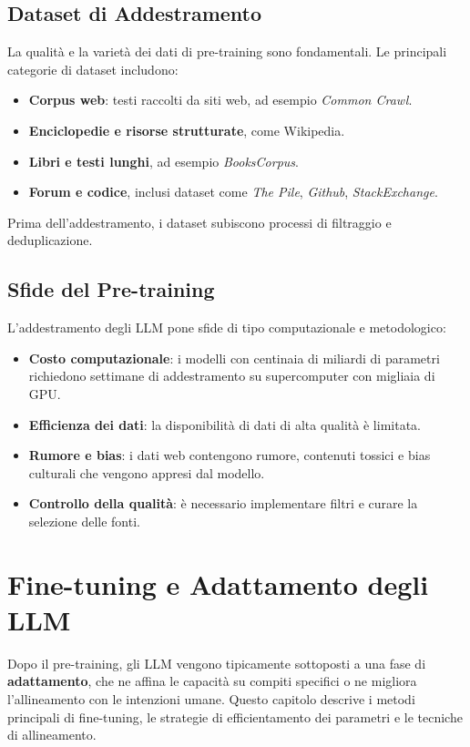 \subsection{Dataset di Addestramento}
La qualità e la varietà dei dati di pre-training sono fondamentali. Le principali categorie di dataset includono:
\begin{itemize}
    \item \textbf{Corpus web}: testi raccolti da siti web, ad esempio \textit{Common Crawl}.
    \item \textbf{Enciclopedie e risorse strutturate}, come Wikipedia.
    \item \textbf{Libri e testi lunghi}, ad esempio \textit{BooksCorpus}.
    \item \textbf{Forum e codice}, inclusi dataset come \textit{The Pile}, \textit{Github}, \textit{StackExchange}.
\end{itemize}
Prima dell'addestramento, i dataset subiscono processi di filtraggio e deduplicazione.

\subsection{Sfide del Pre-training}
L'addestramento degli LLM pone sfide di tipo computazionale e metodologico:
\begin{itemize}
    \item \textbf{Costo computazionale}: i modelli con centinaia di miliardi di parametri richiedono settimane di addestramento su supercomputer 
    con migliaia di GPU.
    \item \textbf{Efficienza dei dati}: la disponibilità di dati di alta qualità è limitata.
    \item \textbf{Rumore e bias}: i dati web contengono rumore, contenuti tossici e bias culturali che vengono appresi dal modello.
    \item \textbf{Controllo della qualità}: è necessario implementare filtri e curare la selezione delle fonti.
\end{itemize}

\newpage
\section{Fine-tuning e Adattamento degli LLM}

Dopo il pre-training, gli LLM vengono tipicamente sottoposti a una fase di \textbf{adattamento}, che ne affina le capacità su compiti specifici o 
ne migliora l'allineamento con le intenzioni umane. Questo capitolo descrive i metodi principali di fine-tuning, le strategie di efficientamento 
dei parametri e le tecniche di allineamento.

